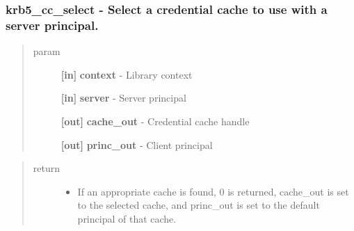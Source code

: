 \documentclass[letterpaper,10pt,english]{sphinxmanual}
\begin{document}
\subsubsection{krb5\_cc\_select -  Select a credential cache to use with a server principal.}
\label{appdev/refs/api/krb5_cc_select::doc}\label{appdev/refs/api/krb5_cc_select:krb5-cc-select-select-a-credential-cache-to-use-with-a-server-principal}

\begin{fulllineitems}
\label{appdev/refs/api/krb5_cc_select:krb5_cc_select}
\end{fulllineitems}

\begin{quote}\begin{description}
\item[{param}] \leavevmode
\textbf{{[}in{]}} \textbf{context} - Library context

\textbf{{[}in{]}} \textbf{server} - Server principal

\textbf{{[}out{]}} \textbf{cache\_out} - Credential cache handle

\textbf{{[}out{]}} \textbf{princ\_out} - Client principal

\end{description}\end{quote}
\begin{quote}\begin{description}
\item[{return}] \leavevmode\begin{itemize}
\item {} 
If an appropriate cache is found, 0 is returned, cache\_out is set to the selected cache, and princ\_out is set to the default principal of that cache.

\end{itemize}

\end{description}\end{quote}
\end{document}
